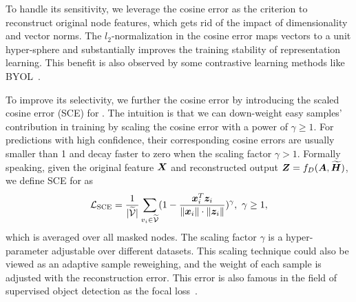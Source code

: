 To handle its sensitivity, we leverage the cosine error as the criterion to reconstruct original node features, which gets rid of the impact of dimensionality and vector norms. 
The $l_2$-normalization in the cosine error maps vectors to a unit hyper-sphere and substantially improves the training stability of representation learning. 
This benefit is also observed by some contrastive learning methods like BYOL~\cite{grill2020bootstrap}. 

To improve its selectivity, we further the cosine error by introducing the scaled cosine error (SCE) for \model. 
The intuition is that we can down-weight easy samples' contribution in training by scaling the cosine error with a power of $\gamma\ge 1$. 
For predictions with high confidence, their corresponding cosine errors are usually smaller than 1 and decay faster to zero when the scaling factor $\gamma>1$. 
Formally speaking, given the original feature ${\bm{X}}$ and reconstructed output ${\bm{Z}}=f_D({\bm{A}}, \widetilde{{\bm{H}}})$, we define SCE for \model as 
\begin{equation}
    \mathcal{L}_{\textrm{SCE}} = \frac{1}{|\widetilde{\mathcal{V}}|} \sum_{v_i \in \widetilde{\mathcal{V}}} (1 - \frac{{\bm{x}}^T_i {\bm{z}}_i}{\| {\bm{x}}_i\| \cdot \| {\bm{z}}_i\|})^\gamma,~ \gamma \ge 1,
    \label{eq:loss}
\end{equation}
which is averaged over all masked nodes. 
The scaling factor $\gamma$ is a hyper-parameter adjustable over different datasets.
This scaling technique could also be viewed as an adaptive sample reweighing, and the weight of each sample is adjusted with the reconstruction error. 
This error is also famous in the field of supervised object detection as the focal loss~\cite{lin2017focal}.





